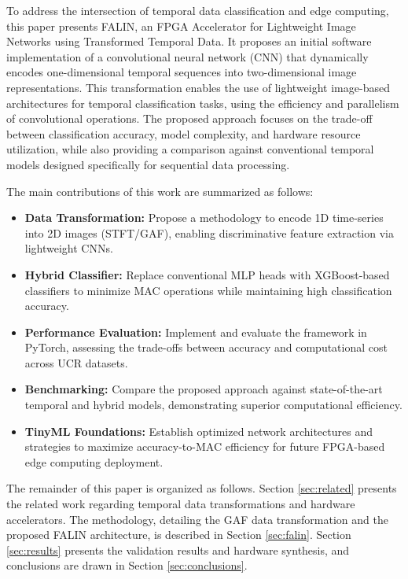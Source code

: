 \documentclass[10pt,conference]{IEEEtran}
\begin{document}
To address the intersection of temporal data classification and edge computing, this paper presents FALIN, an FPGA Accelerator for Lightweight Image Networks using Transformed Temporal Data. It proposes an initial software implementation of a convolutional neural network (CNN) that dynamically encodes one-dimensional temporal sequences into two-dimensional image representations. This transformation enables the use of lightweight image-based architectures for temporal classification tasks, using the efficiency and parallelism of convolutional operations. The proposed approach focuses on the trade-off between classification accuracy, model complexity, and hardware resource utilization, while also providing a comparison against conventional temporal models designed specifically for sequential data processing.

The main contributions of this work are summarized as follows:

\begin{itemize}
    \item \textbf{Data Transformation:} Propose a methodology to encode 1D time-series into 2D images (STFT/GAF), enabling discriminative feature extraction via lightweight CNNs.
    \item \textbf{Hybrid Classifier:} Replace conventional MLP heads with XGBoost-based classifiers to minimize MAC operations while maintaining high classification accuracy.
    \item \textbf{Performance Evaluation:} Implement and evaluate the framework in PyTorch, assessing the trade-offs between accuracy and computational cost across UCR datasets.
    \item \textbf{Benchmarking:} Compare the proposed approach against state-of-the-art temporal and hybrid models, demonstrating superior computational efficiency.
    \item \textbf{TinyML Foundations:} Establish optimized network architectures and strategies to maximize accuracy-to-MAC efficiency for future FPGA-based edge computing deployment.
\end{itemize}


The remainder of this paper is organized as follows. Section \ref{sec:related} presents the related work regarding temporal data transformations and hardware accelerators. The methodology, detailing the GAF data transformation and the proposed FALIN architecture, is described in Section \ref{sec:falin}. Section \ref{sec:results} presents the validation results and hardware synthesis, and conclusions are drawn in Section \ref{sec:conclusions}.
\end{document}
